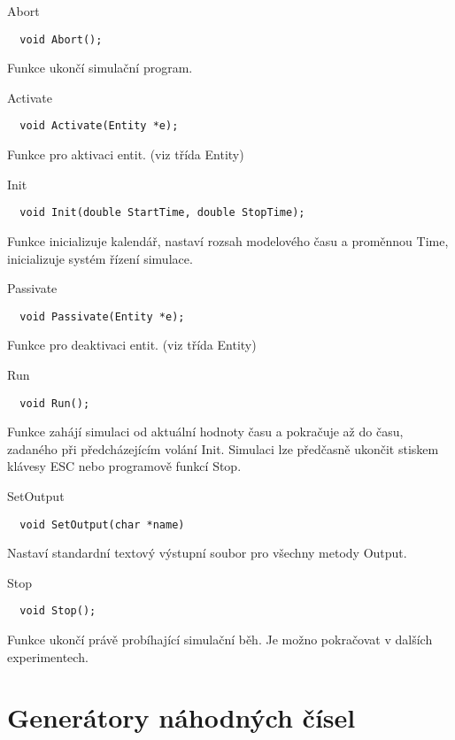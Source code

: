 \documentclass[a4paper]{article}
\begin{document}
Abort

\begin{verbatim}
  void Abort();
\end{verbatim}


Funkce ukončí simulační program.


Activate

\begin{verbatim}
  void Activate(Entity *e);
\end{verbatim}


Funkce pro aktivaci entit. (viz třída Entity)


Init

\begin{verbatim}
  void Init(double StartTime, double StopTime);
\end{verbatim}


Funkce inicializuje kalendář, nastaví rozsah modelového času a proměnnou
Time, inicializuje systém řízení simulace.


Passivate

\begin{verbatim}
  void Passivate(Entity *e);
\end{verbatim}


Funkce pro deaktivaci entit. (viz třída Entity)


Run

\begin{verbatim}
  void Run();
\end{verbatim}


Funkce zahájí simulaci od aktuální hodnoty času a pokračuje až do
času, zadaného při předcházejícím volání Init. Simulaci
lze předčasně ukončit stiskem klávesy ESC nebo programově funkcí
Stop.


SetOutput

\begin{verbatim}
  void SetOutput(char *name)
\end{verbatim}


Nastaví standardní textový výstupní soubor pro všechny metody Output.


Stop

\begin{verbatim}
  void Stop();
\end{verbatim}


Funkce ukončí právě probíhající simulační běh. Je možno pokračovat
v dalších experimentech.




\section{Generátory náhodných čísel}
\end{document}
